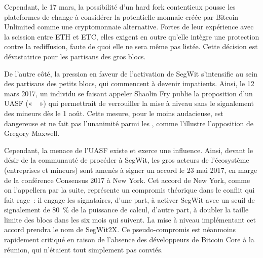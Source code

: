Cependant, le 17 mars, la possibilité d'un hard fork contentieux pousse les plateformes de change à considérer la potentielle monnaie créée par Bitcoin Unlimited comme une cryptomonnaie alternative. Fortes de leur expérience avec la scission entre ETH et ETC, elles exigent en outre qu'elle intègre une protection contre la rediffusion, faute de quoi elle ne sera même pas listée. Cette décision est dévastatrice pour les partisans des gros blocs.

De l'autre côté, la pression en faveur de l'activation de SegWit s'intensifie au sein des partisans des petits blocs, qui commencent à devenir impatients. Ainsi, le 12 mars 2017, un individu se faisant appeler Shaolin Fry publie la proposition d'un UASF («~~») qui permettrait de verrouiller la mise à niveau sans le signalement des mineurs dès le 1\ier{} août. Cette mesure, pour le moins audacieuse, est dangereuse et ne fait pas l'unanimité parmi les , comme l'illustre l'opposition de Gregory Maxwell.

Cependant, la menace de l'UASF existe et exerce une influence. Ainsi, devant le désir de la communauté de procéder à SegWit, les gros acteurs de l'écosystème (entreprises et mineurs) sont amenés à signer un accord le 23 mai 2017, en marge de la conférence Consensus 2017 à New York. Cet accord de New York, comme on l'appellera par la suite, représente un compromis théorique dans le conflit qui fait rage~: il engage les signataires, d'une part, à activer SegWit avec un seuil de signalement de 80~\% de la puissance de calcul, d'autre part, à doubler la taille limite des blocs dans les six mois qui suivent. La mise à niveau implémentant cet accord prendra le nom de SegWit2X. Ce pseudo-compromis est néanmoins rapidement critiqué en raison de l'absence des développeurs de Bitcoin Core à la réunion, qui n'étaient tout simplement pas conviés.

